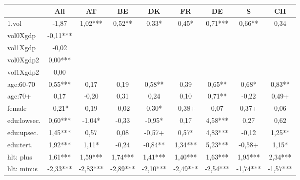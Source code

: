 {
\def\sym#1{\ifmmode^{#1}\else\(^{#1}\)\fi}
\begin{tabular}{l*{8}{c}}
\hline\hline
            &\multicolumn{1}{c}{All}&\multicolumn{1}{c}{AT}&\multicolumn{1}{c}{BE}&\multicolumn{1}{c}{DK}&\multicolumn{1}{c}{FR}&\multicolumn{1}{c}{DE}&\multicolumn{1}{c}{S}&\multicolumn{1}{c}{CH}\\
\hline
1.vol       &       -1,87   &        1,02***&        0,52** &        0,33*  &        0,45*  &        0,71***&        0,66** &        0,34   \\
vol0Xgdp    &       -0,11***&               &               &               &               &               &               &               \\
vol1Xgdp    &       -0,02   &               &               &               &               &               &               &               \\
vol0Xgdp2   &        0,00***&               &               &               &               &               &               &               \\
vol1Xgdp2   &        0,00   &               &               &               &               &               &               &               \\
age:60-70   &        0,55***&        0,17   &        0,19   &        0,58** &        0,39   &        0,65** &        0,68*  &        0,83** \\
age:70+     &        0,17   &       -0,20   &        0,31   &        0,24   &        0,10   &        0,71** &       -0,22   &        0,49+  \\
female      &       -0,21*  &        0,19   &       -0,02   &        0,30*  &       -0,38+  &        0,07   &        0,37+  &        0,06   \\
edu:lowsec. &        0,60***&       -1,04*  &       -0,33   &       -0,95*  &        0,17   &        4,58***&        0,27   &        0,62   \\
edu:upsec.  &        1,45***&        0,57   &        0,08   &       -0,57+  &        0,57*  &        4,83***&       -0,12   &        1,25** \\
edu:tert.   &        1,92***&        1,11*  &       -0,24   &       -0,84** &        1,34***&        5,23***&       -0,58+  &        1,15*  \\
hlt: plus   &        1,61***&        1,59***&        1,74***&        1,41***&        1,40***&        1,63***&        1,95***&        2,34***\\
hlt: minus  &       -2,33***&       -2,83***&       -2,89***&       -2,10***&       -2,49***&       -2,54***&       -1,74***&       -1,57***\\

\end{tabular}}
